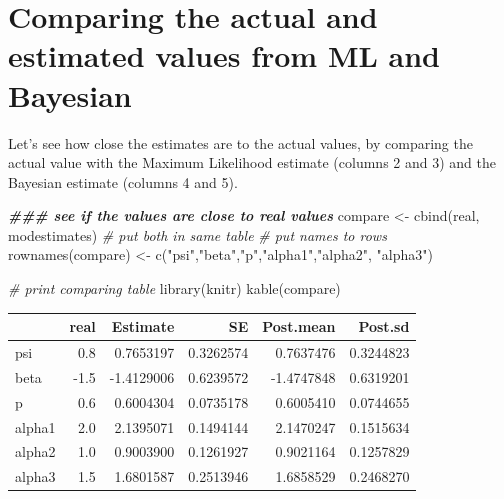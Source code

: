 \documentclass[
]{book}
\newenvironment{Shaded}{\begin{snugshade}}{\end{snugshade}}
\newcommand{\CommentTok}[1]{\textcolor[rgb]{0.56,0.35,0.01}{\textit{#1}}}
\newcommand{\DocumentationTok}[1]{\textcolor[rgb]{0.56,0.35,0.01}{\textbf{\textit{#1}}}}
\newcommand{\FunctionTok}[1]{\textcolor[rgb]{0.00,0.00,0.00}{#1}}
\newcommand{\NormalTok}[1]{#1}
\newcommand{\OtherTok}[1]{\textcolor[rgb]{0.56,0.35,0.01}{#1}}
\newcommand{\SpecialCharTok}[1]{\textcolor[rgb]{0.00,0.00,0.00}{#1}}
\newcommand{\StringTok}[1]{\textcolor[rgb]{0.31,0.60,0.02}{#1}}
\begin{document}
\begin{Shaded}
\end{Shaded}

\hypertarget{comparing-the-actual-and-estimated-values-from-ml-and-bayesian}{%
\section{Comparing the actual and estimated values from ML and Bayesian}\label{comparing-the-actual-and-estimated-values-from-ml-and-bayesian}}

Let's see how close the estimates are to the actual values, by comparing the actual value with the Maximum Likelihood estimate (columns 2 and 3) and the Bayesian estimate (columns 4 and 5).

\begin{Shaded}
\begin{Highlighting}[]
\DocumentationTok{\#\#\# see if the values are close to real values}
\NormalTok{compare }\OtherTok{\textless{}{-}} \FunctionTok{cbind}\NormalTok{(real, modestimates) }\CommentTok{\# put both in same table}
\CommentTok{\# put names to rows}
\FunctionTok{rownames}\NormalTok{(compare) }\OtherTok{\textless{}{-}} \FunctionTok{c}\NormalTok{(}\StringTok{"psi"}\NormalTok{,}\StringTok{"beta"}\NormalTok{,}\StringTok{"p"}\NormalTok{,}\StringTok{"alpha1"}\NormalTok{,}\StringTok{"alpha2"}\NormalTok{, }\StringTok{"alpha3"}\NormalTok{)}

\CommentTok{\# print comparing table}
\FunctionTok{library}\NormalTok{(knitr)}
\FunctionTok{kable}\NormalTok{(compare)}
\end{Highlighting}
\end{Shaded}

\begin{tabular}{l|r|r|r|r|r}
\hline
  & real & Estimate & SE & Post.mean & Post.sd\\
\hline
psi & 0.8 & 0.7653197 & 0.3262574 & 0.7637476 & 0.3244823\\
\hline
beta & -1.5 & -1.4129006 & 0.6239572 & -1.4747848 & 0.6319201\\
\hline
p & 0.6 & 0.6004304 & 0.0735178 & 0.6005410 & 0.0744655\\
\hline
alpha1 & 2.0 & 2.1395071 & 0.1494144 & 2.1470247 & 0.1515634\\
\hline
alpha2 & 1.0 & 0.9003900 & 0.1261927 & 0.9021164 & 0.1257829\\
\hline
alpha3 & 1.5 & 1.6801587 & 0.2513946 & 1.6858529 & 0.2468270\\
\hline
\end{tabular}
\end{document}
